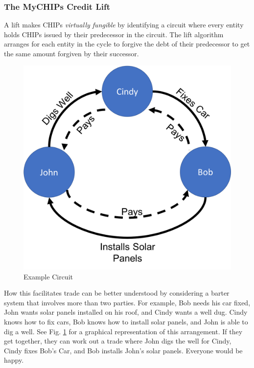 \documentclass[runningheads]{llncs}
\begin{document}
\subsubsection{The MyCHIPs Credit Lift}
A lift makes CHIPs \emph{virtually fungible} by identifying a circuit where every entity holds CHIPs issued by their predecessor in the circuit. The lift algorithm arranges for each entity in the cycle to forgive the debt of their predecessor to get the same amount forgiven by their successor. 
 
\begin{figure}[h]
    \centering
    \includegraphics[scale=0.3]{ExampleCircuit.png}
    \caption{Example Circuit}
    \label{fig:liftProt}
\end{figure}
How this facilitates trade can be better understood by considering a barter system that involves more than two parties. 
For example, Bob needs his car fixed, John wants solar panels installed on his roof, and Cindy wants a well dug. Cindy knows how to fix cars, Bob knows how to install solar panels, and John is able to dig a well. See Fig. \ref{fig:liftProt} for a graphical representation of this arrangement. If they get together, they can work out a trade where John digs the well for Cindy, Cindy fixes Bob's Car, and Bob installs John's solar panels. Everyone would be happy.
\end{document}
